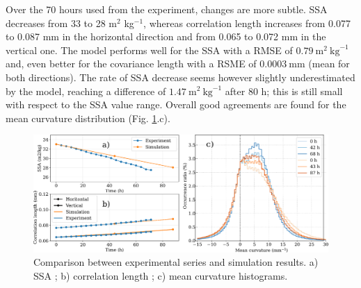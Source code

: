 \documentclass[draft,ms]{agujournal2019}
\begin{document}
 Over the 70 hours used from the  experiment, changes are more subtle. SSA decreases from 33 to 28 m$^2$ kg$^{-1}$, whereas correlation length increases from 0.077 to 0.087 mm in the horizontal direction and from 0.065 to 0.072 mm in the vertical one. The model performs well for the SSA with a RMSE of $0.79\ \mathrm{m}^2\ \mathrm{kg}^{-1}$ and, even better for the covariance length with a RSME of $0.0003\ \mathrm{mm}$ (mean for both directions).
The rate of SSA decrease seems however slightly underestimated by the model, reaching a difference of $1.47\ \mathrm{m}^2\ \mathrm{kg}^{-1}$ after 80 h; this is still small with respect to the SSA value range.
Overall good agreements are found for the mean curvature distribution (Fig. \ref{fig:eboni}.c). \\



\begin{figure}
    \centering
    \includegraphics[width=\linewidth]{Figures/eboni_courbes_lc_ssa_histo.pdf}
    \caption{Comparison between \protect{} experimental series and simulation results. a) SSA ; b) correlation length ; c) mean curvature histograms.}
    \label{fig:eboni}
\end{figure}
\end{document}
